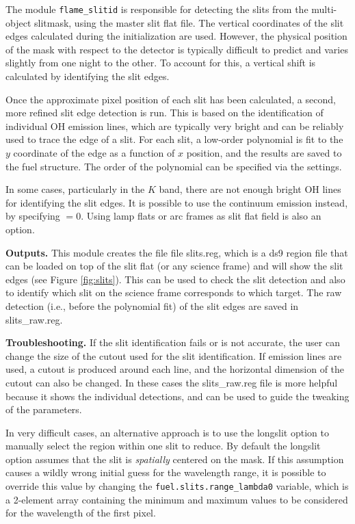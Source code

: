 \documentclass[a4paper]{article}
\begin{document}
\begin{sloppypar}
The module \texttt{flame\_slitid} is responsible for detecting the slits from the multi-object slitmask, using the master slit flat file. The vertical coordinates of the slit edges calculated during the initialization are used. However, the physical position of the mask with respect to the detector is typically difficult to predict and varies slightly from one night to the other. To account for this, a vertical shift is calculated by identifying the slit edges.

Once the approximate pixel position of each slit has been calculated, a second, more refined slit edge detection is run. This is based on the identification of individual OH emission lines, which are typically very bright and can be reliably used to trace the edge of a slit. For each slit, a low-order polynomial is fit to the $y$ coordinate of the edge as a function of $x$ position, and the results are saved to the fuel structure. The order of the polynomial can be specified via the settings.

In some cases, particularly in the $K$ band, there are not enough bright OH lines for identifying the slit edges. It is possible to use the continuum emission instead, by specifying $ = 0$. Using lamp flats or arc frames as slit flat field is also an option.

\medskip
\noindent
\textbf{Outputs.} This module creates the file file slits.reg, which is a ds9 region file that can be loaded on top of the slit flat (or any science frame) and will show the slit edges (see Figure \ref{fig:slits}). This can be used to check the slit detection and also to identify which slit on the science frame corresponds to which target. The raw detection (i.e., before the polynomial fit) of the slit edges are saved in slits\_raw.reg.

\medskip
\noindent
\textbf{Troubleshooting.} If the slit identification fails or is not accurate, the user can change the size of the cutout used for the slit identification. If emission lines are used, a cutout is produced around each line, and the horizontal dimension of the cutout can also be changed. In these cases the slits\_raw.reg file is more helpful because it shows the individual detections, and can be used to guide the tweaking of the parameters.

In very difficult cases, an alternative approach is to use the longslit option to manually select the region within one slit to reduce. By default the longslit option assumes that the slit is \emph{spatially} centered on the mask. If this assumption causes a wildly wrong initial guess for the wavelength range, it is possible to override this value by changing the \texttt{fuel.slits.range\_lambda0} variable, which is a 2-element array containing the minimum and maximum values to be considered for the wavelength of the first pixel.



\end{sloppypar}
\end{document}
